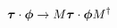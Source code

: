 \begin{equation}
\mbox{\boldmath$\tau$}\cdot \mbox{\boldmath$\phi$}\rightarrow M\mbox{\boldmath$\tau$}\cdot \mbox{\boldmath$\phi$}M^\dag 
\end{equation}


